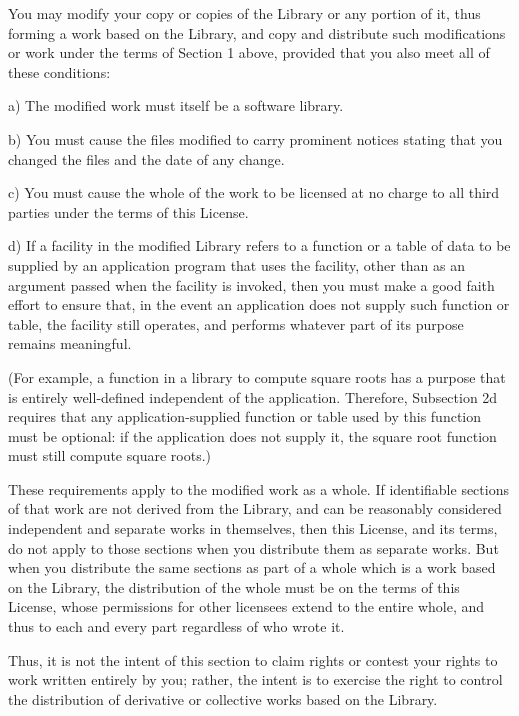 \begin{DoxyEnumerate}
\item You may modify your copy or copies of the Library or any portion of it, thus forming a work based on the Library, and copy and distribute such modifications or work under the terms of Section 1 above, provided that you also meet all of these conditions\+: \begin{DoxyVerb}a) The modified work must itself be a software library.

b) You must cause the files modified to carry prominent notices
stating that you changed the files and the date of any change.

c) You must cause the whole of the work to be licensed at no
charge to all third parties under the terms of this License.

d) If a facility in the modified Library refers to a function or a
table of data to be supplied by an application program that uses
the facility, other than as an argument passed when the facility
is invoked, then you must make a good faith effort to ensure that,
in the event an application does not supply such function or
table, the facility still operates, and performs whatever part of
its purpose remains meaningful.

(For example, a function in a library to compute square roots has
a purpose that is entirely well-defined independent of the
application.  Therefore, Subsection 2d requires that any
application-supplied function or table used by this function must
be optional: if the application does not supply it, the square
root function must still compute square roots.)
\end{DoxyVerb}

\end{DoxyEnumerate}

These requirements apply to the modified work as a whole. If identifiable sections of that work are not derived from the Library, and can be reasonably considered independent and separate works in themselves, then this License, and its terms, do not apply to those sections when you distribute them as separate works. But when you distribute the same sections as part of a whole which is a work based on the Library, the distribution of the whole must be on the terms of this License, whose permissions for other licensees extend to the entire whole, and thus to each and every part regardless of who wrote it.

Thus, it is not the intent of this section to claim rights or contest your rights to work written entirely by you; rather, the intent is to exercise the right to control the distribution of derivative or collective works based on the Library.

